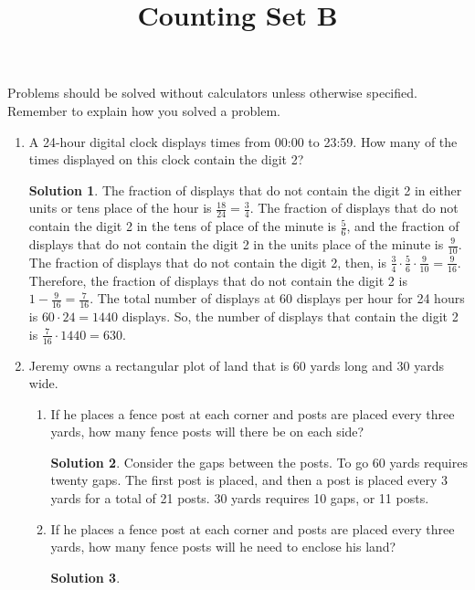 \documentclass{article}
\title{Counting Set B}
\author{}
\date{}
\theoremstyle{definition}
\newtheorem*{solution}{Solution}
\begin{document}
    \maketitle
    \noindent Problems should be solved without calculators unless otherwise specified.
    Remember to explain how you solved a problem.
    \begin{enumerate}
        \item A 24-hour digital clock displays times from 00:00 to 23:59. How many of the times
        displayed on this clock contain the digit 2?
        \begin{solution}
            The fraction of displays that do not contain the digit 2 in either units or tens
            place of the hour is $\frac{18}{24} = \frac{3}{4}$. The fraction of displays that do
            not contain the digit 2 in the tens of place of the minute is $\frac{5}{6}$, and the
            fraction of displays that do not contain the digit 2 in the units place of the minute
            is  $\frac{9}{10}$. The fraction of displays that do not contain the digit 2, then, is
            $\frac{3}{4} \cdot \frac{5}{6} \cdot \frac{9}{10} = \frac{9}{16}$. Therefore, the
            fraction of displays that do not contain the digit 2 is $1 - \frac{9}{16} = \frac{7}{16}$.
            The total number of displays at 60 displays per hour for 24 hours is $60 \cdot 24 = 1440$ displays.
            So, the number of displays that contain the digit 2 is $\frac{7}{16} \cdot 1440 = 630$.
        \end{solution}
        \item Jeremy owns a rectangular plot of land that is 60 yards long and 30 yards wide.
        \begin{enumerate}
            \item If he places a fence post at each corner and posts are placed every three yards,
            how many fence posts will there be on each side?
            \begin{solution}
                Consider the gaps between the posts. To go 60 yards requires twenty gaps. The first
                post is placed, and then a post is placed every 3 yards for a total of 21 posts.
                30 yards requires 10 gaps, or 11 posts.
            \end{solution}
            \item If he places a fence post at each corner and posts are placed every three yards,
            how many fence posts will he need to enclose his land?
            \begin{solution}

\end{solution}
\end{enumerate}
\end{enumerate}
\end{document}
